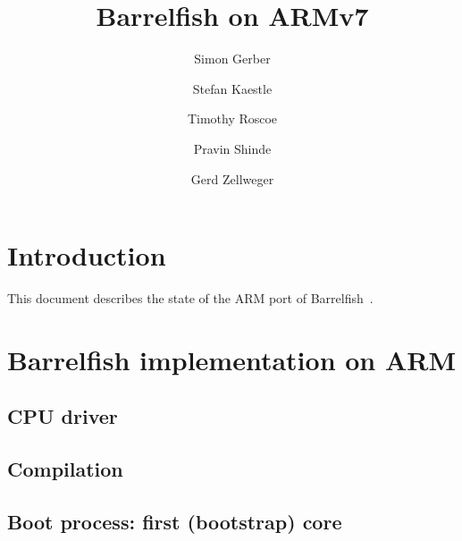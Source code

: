 \documentclass[a4paper,twoside]{report} %
\title{Barrelfish on ARMv7}   %
\author{Simon Gerber \and Stefan Kaestle \and Timothy Roscoe \and
  Pravin Shinde \and Gerd Zellweger}
\begin{document}
\maketitle

%
%
\begin{versionhistory}
\end{versionhistory}



\newcommand{\eclipse}{ECL\textsuperscript{i}PS\textsuperscript{e}\xspace}
\newcommand{\codesize}{\scriptsize}
\newcommand{\note}[1]{[\textcolor{red}{\emph{#1}}]}

\chapter{Introduction}

This document describes the state of the ARM port of
Barrelfish~\cite{barrelfish:sosp09}.

\chapter{Barrelfish implementation on ARM}\label{chap:impl}

\section{CPU driver}

\section{Compilation}

\section{Boot process: first (bootstrap) core}
\end{document}
